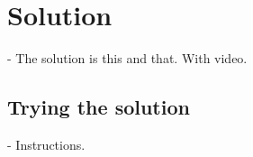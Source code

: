 \section{Solution}
- The solution is this and that.
With video.

\subsection{Trying the solution}
- Instructions.